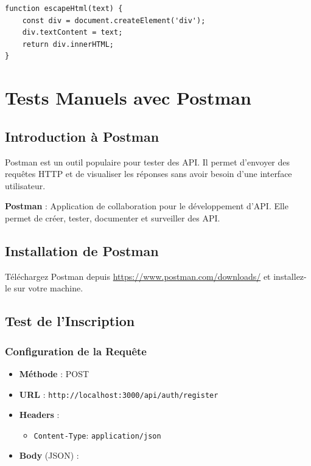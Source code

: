 \begin{lstlisting}[style=javascript, caption=Échappement HTML]
function escapeHtml(text) {
    const div = document.createElement('div');
    div.textContent = text;
    return div.innerHTML;
}
\end{lstlisting}

\chapter{Tests Manuels avec Postman}

\section{Introduction à Postman}

Postman est un outil populaire pour tester des API. Il permet d'envoyer des requêtes HTTP et de visualiser les réponses sans avoir besoin d'une interface utilisateur.

\begin{definitionbox}
    \textbf{Postman} : Application de collaboration pour le développement d'API. Elle permet de créer, tester, documenter et surveiller des API.
\end{definitionbox}

\section{Installation de Postman}

Téléchargez Postman depuis \url{https://www.postman.com/downloads/} et installez-le sur votre machine.

\section{Test de l'Inscription}

\subsection{Configuration de la Requête}

\begin{itemize}
    \item \textbf{Méthode} : POST
    \item \textbf{URL} : \texttt{http://localhost:3000/api/auth/register}
    \item \textbf{Headers} :
        \begin{itemize}
            \item \texttt{Content-Type}: \texttt{application/json}
        \end{itemize}
    \item \textbf{Body} (JSON) :
\end{itemize}

